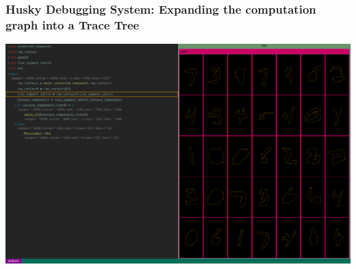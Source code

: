 \documentclass{beamer}   	%
\theoremstyle{definition}
\begin{document}
\begin{frame}
\frametitle{Husky Debugging System: Expanding the computation graph into a Trace Tree}
\includegraphics[width=\linewidth]{snapshots/trace-based-debugging-system.png}
\end{frame}
\end{document}

